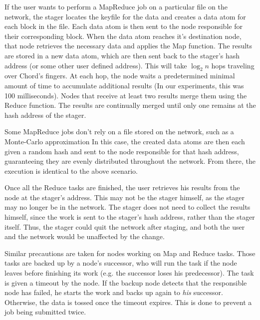 If the user wants to perform a MapReduce job on a particular file on the network, the stager locates the keyfile for the data and creates a data atom for each block in the file.  
Each data atom is then sent to the node responsible for their corresponding block.  
When the data atom reaches it's destination node, that node retrieves the necessary data and applies the Map function.  
The results are stored in a new data atom,  which are then sent back to the stager's hash address (or some other user defined address).  
This will take $\log_{2} n$ hops traveling over Chord's fingers.  
At each hop, the node waits a predetermined minimal amount of time to accumulate additional results (In our experiments, this was 100 milliseconds).  
Nodes that receive at least two results merge them using the Reduce function.  
The results are continually merged until only one remains at the hash address of the stager. 


Some MapReduce jobs don't rely on a file stored on the network, such as a Monte-Carlo approximation
In this case, the created data atoms are then each given a random hash and sent to the node responsible for that hash address, guaranteeing they are evenly distributed throughout the network. 
From there, the execution is identical to the above scenario.



Once all the Reduce tasks are finished, the user retrieves his results from the node at the stager's address.  
This may not be the stager himself, as the stager may no longer be in the network.  
The stager does not need to collect the results himself, since the work is sent to the stager's hash address, rather than the stager itself.  
Thus, the stager could quit the network after staging, and both the user and the network would be unaffected by the change. %

Similar precautions are taken for nodes working on Map and Reduce tasks.  
Those tasks are backed up by a node's successor, who will run the task if the node leaves before finishing its work (e.g. the successor loses his predecessor).   
The task is given a timeout by the node.  
If the backup node detects that the responsible node has failed, he starts the work and backs up again to \emph{his} successor.  
Otherwise, the data is tossed once the timeout expires.
This is done to prevent a job being submitted twice.

